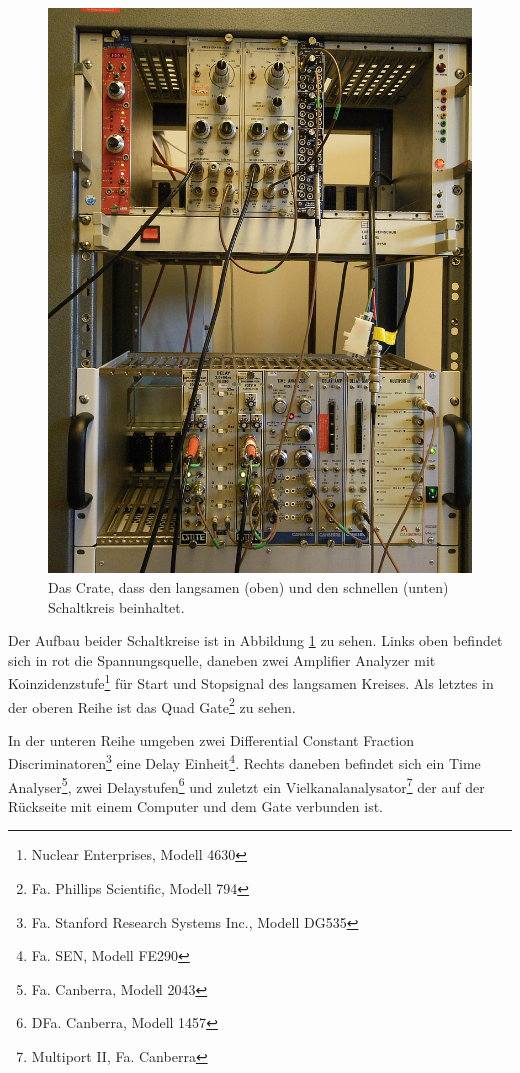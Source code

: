 \documentclass[a4paper,12pt]{article}
\begin{document}
\begin{figure}[htb]
		\centering
		\includegraphics[width=.5\textwidth]{aufbau.jpg}
		\caption{Das Crate, dass den langsamen (oben) und den schnellen (unten) Schaltkreis beinhaltet.}
		\label{fig:aufbau}
\end{figure}

Der Aufbau beider Schaltkreise ist in Abbildung \ref{fig:aufbau} zu sehen.
Links oben befindet sich in rot die Spannungsquelle, daneben zwei Amplifier Analyzer mit Koinzidenzstufe\footnote{Nuclear Enterprises, Modell 4630} für Start und Stopsignal des langsamen Kreises.
Als letztes in der oberen Reihe ist das Quad Gate\footnote{Fa. Phillips Scientific, Modell 794} zu sehen.

In der unteren Reihe umgeben zwei Differential Constant Fraction Discriminatoren\footnote{Fa. Stanford Research Systems Inc., Modell DG535} eine Delay Einheit\footnote{Fa. SEN, Modell FE290}.
Rechts daneben befindet sich ein Time Analyser\footnote{Fa. Canberra, Modell 2043}, zwei Delaystufen\footnote{DFa. Canberra, Modell 1457} und zuletzt ein Vielkanalanalysator\footnote{Multiport II, Fa. Canberra}
 der auf der Rückseite mit einem Computer und dem Gate verbunden ist.
\end{document}
